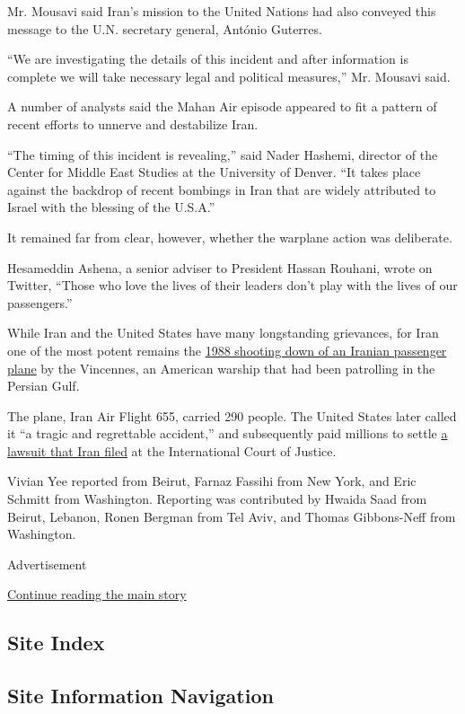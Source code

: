 Mr. Mousavi said Iran's mission to the United Nations had also conveyed
this message to the U.N. secretary general, António Guterres.

``We are investigating the details of this incident and after
information is complete we will take necessary legal and political
measures,'' Mr. Mousavi said.

A number of analysts said the Mahan Air episode appeared to fit a
pattern of recent efforts to unnerve and destabilize Iran.

``The timing of this incident is revealing,'' said Nader Hashemi,
director of the Center for Middle East Studies at the University of
Denver. ``It takes place against the backdrop of recent bombings in Iran
that are widely attributed to Israel with the blessing of the U.S.A.''

It remained far from clear, however, whether the warplane action was
deliberate.

Hesameddin Ashena, a senior adviser to President Hassan Rouhani, wrote
on Twitter, ``Those who love the lives of their leaders don't play with
the lives of our passengers.''

While Iran and the United States have many longstanding grievances, for
Iran one of the most potent remains the
\href{https://timesmachine.nytimes.com/timesmachine/1988/07/04/issue.html}{1988
shooting down of an Iranian passenger plane} by the Vincennes, an
American warship that had been patrolling in the Persian Gulf.

The plane, Iran Air Flight 655, carried 290 people. The United States
later called it ``a tragic and regrettable accident,'' and subsequently
paid millions to settle \href{https://www.icj-cij.org/en/case/79}{a
lawsuit that Iran filed} at the International Court of Justice.

Vivian Yee reported from Beirut, Farnaz Fassihi from New York, and Eric
Schmitt from Washington. Reporting was contributed by Hwaida Saad from
Beirut, Lebanon, Ronen Bergman from Tel Aviv, and Thomas Gibbons-Neff
from Washington.

Advertisement

\protect\hyperlink{after-bottom}{Continue reading the main story}

\hypertarget{site-index}{%
\subsection{Site Index}\label{site-index}}

\hypertarget{site-information-navigation}{%
\subsection{Site Information
Navigation}\label{site-information-navigation}}

